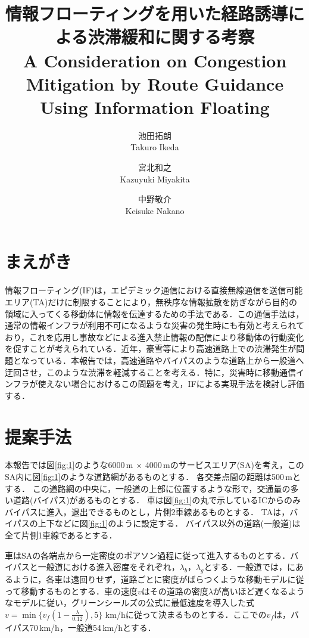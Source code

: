 \documentclass[twocolumn,a4paper,dvipdfmx]{ieicejsp}
\title{{\bf 情報フローティングを用いた経路誘導による渋滞緩和に関する考察}
  {\normalsize \\A Consideration on Congestion Mitigation by Route Guidance Using Information Floating}}
\author{
    池田拓朗 \\ Takuro Ikeda \and
    宮北和之 \\ Kazuyuki Miyakita \and
    中野敬介 \\ Keisuke Nakano 
  }
\begin{document}
\maketitle
\section{まえがき}
情報フローティング(IF)は，エピデミック通信における直接無線通信を送信可能エリア(TA)だけに制限することにより，無秩序な情報拡散を防ぎながら目的の領域に入ってくる移動体に情報を伝達するための手法である．この通信手法は，通常の情報インフラが利用不可になるような災害の発生時にも有効と考えられており，これを応用し事故などによる進入禁止情報の配信により移動体の行動変化を促すことが考えられている\cite{miyakita_kotuyudo}．近年，豪雪等により高速道路上での渋滞発生が問題となっている．本報告では，高速道路やバイパスのような道路上から一般道へ迂回させ，このような渋滞を軽減することを考える．特に，災害時に移動通信インフラが使えない場合におけるこの問題を考え，IFによる実現手法を検討し評価する．


\section{提案手法}
本報告では図\ref{fig:1}のような6000\,m × 4000\,mのサービスエリア(SA)を考え，このSA内に図\ref{fig:1}のような道路網があるものとする．
各交差点間の距離は500\,mとする．
この道路網の中央に，一般道の上部に位置するような形で，交通量の多い道路(バイパス)があるものとする．
車は図\ref{fig:1}の丸で示しているICからのみバイパスに進入，退出できるものとし，片側2車線あるものとする．
TAは，バイパスの上下などに図\ref{fig:1}のように設定する．
バイパス以外の道路(一般道)は全て片側1車線であるとする．

車はSAの各端点から一定密度のポアソン過程に従って進入するものとする．バイパスと一般道における進入密度をそれぞれ，$\lambda_b$，$\lambda_g$とする．一般道では，\cite{miyakita_kotuyudo}にあるように，各車は遠回りせず，道路ごとに密度がばらつくような移動モデルに従って移動するものとする．車の速度$v$はその道路の密度$\lambda$が高いほど遅くなるようなモデルに従い，グリーンシールズの公式に最低速度を導入した式$v=\min \{ v_f(1-\frac{\lambda}{0.12}), 5 \}$ km/hに従って決まるものとする．ここでの$v_f$は，バイパス70\,km/h，一般道54\,km/hとする．
\end{document}
